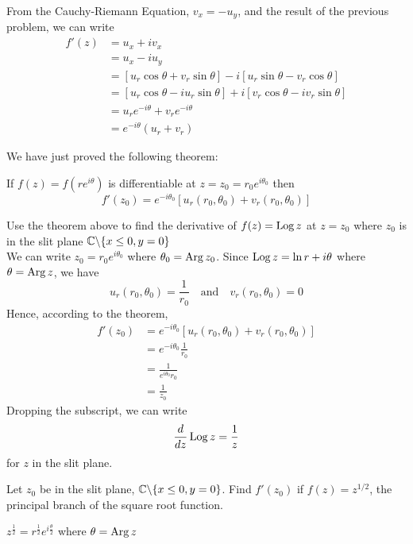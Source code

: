 \documentclass[handout]{ximera}
\begin{document}
From the Cauchy-Riemann Equation, $v_x = -u_y$, and the result of the previous problem, we can write
\begin{align*}
f'(z) &= u_x + iv_x\\
      & = u_x - iu_y\\
      &= \left[u_r \cos \theta + v_r \sin \theta\right] - i\left[ u_r \sin \theta - v_r \cos \theta \right]\\
      &= \left[u_r \cos \theta -i u_r \sin \theta\right] + i\left[ v_r \cos \theta  - iv_r \sin \theta\right]\\
      &= u_r e^{-i\theta} + v_r e^{-i\theta}\\
      &=  e^{-i\theta}(u_r +v_r)
\end{align*}

We have just proved the following theorem:

\begin{theorem}
If $f(z) = f\left(re^{i\theta}\right)$ is differentiable at $z = z_0 = r_0 e^{i\theta_0}$ then
\[
f'(z_0) = e^{-i\theta_0} \left[u_r(r_0, \theta_0) + v_r(r_0, \theta_0)\right]
\]
\end{theorem}

\begin{example}
Use the theorem above to find the derivative of $f(z) = \operatorname{Log} z$ at $z = z_0$ where $z_0$ is in the 
slit plane $\mathbb C \backslash \{x\leq 0, y=0\}$ \\
We can write $z_0 = r_0 e^{i\theta_0}$ where $\theta_0 = \operatorname{Arg} z_0$. Since $\operatorname{Log} z = \ln r + i\theta$
where $\theta = \operatorname{Arg} z$, we have 
\[
u_r(r_0,\theta_0) = \frac{1}{r_0} \quad \mbox{and} \quad v_r(r_0,\theta_0) = 0
\]
Hence, according to the theorem,
\begin{align*}
f'(z_0) &= e^{-i\theta_0}[u_r(r_0,\theta_0)+v_r(r_0,\theta_0)] \\
        &= e^{-i\theta_0}\frac{1}{r_0}\\
        &= \frac{1}{e^{i\theta_0}r_0}\\
        &= \frac{1}{z_0}
\end{align*}
Dropping the subscript, we can write
\[
\frac{d}{dz} \operatorname{Log} z = \frac{1}{z}
\]
for $z$ in the slit plane.
\end{example}

\begin{problem} 
Let $z_0$ be in the slit plane, $\mathbb C \backslash \{x\leq 0, y=0\}$. 
Find $f'(z_0)$ if $f(z) = z^{1/2}$, the principal branch of the square root function.
\begin{hint}
$\displaystyle z^{\frac12} = r^{\frac12}e^{i\frac{\theta}{2}}$ where $\theta = \operatorname{Arg} z$
\end{hint}
\end{problem}
\end{document}
